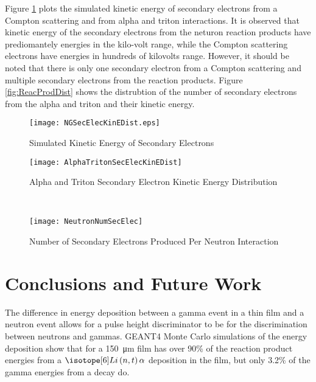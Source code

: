\documentclass[draftcls,onecolumn]{IEEEtran}
\begin{document}
Figure \ref{fig:simKinE} plots the simulated kinetic energy of secondary electrons from a Compton scattering and from alpha and triton interactions.
It is observed that kinetic energy of the secondary electrons from the neturon reaction products have prediomantely energies in the kilo-volt range, while the Compton scattering electrons have energies in hundreds of kilovolts range. 
However, it should be noted that there is only one secondary electron from a Compton scattering and multiple secondary electrons from the reaction products.
Figure \ref{fig:ReacProdDist} shows the distrubtion of the number of secondary electrons from the alpha and triton and their kinetic energy.
\begin{figure}[ht]
    \centering
    \texttt{[image: NGSecElecKinEDist.eps]}
    \caption{Simulated Kinetic Energy of Secondary Electrons }
    \label{fig:simKinE}
\end{figure}
\begin{figure*}[ht]
	\centering
	\begin{subfigure}[b]{0.45\textwidth}
    		\texttt{[image: AlphaTritonSecElecKinEDist]}
		\caption{Alpha and Triton Secondary Electron Kinetic Energy Distribution}
	\end{subfigure}%
	~
	\begin{subfigure}[b]{0.45\textwidth}
    		\texttt{[image: NeutronNumSecElec]}
		\caption{Number of Secondary Electrons Produced Per Neutron Interaction}
	\end{subfigure}%
	\caption{Neutron Reaction Products Secondary Electrons Energies}
	\label{fig:ReacProdDist}
\end{figure*}
\section{Conclusions and Future Work}
\label{sec:Conclusions}

The difference in energy deposition between a gamma event in a thin film and a neutron event allows for a pulse height discriminator to be for the discrimination between neutrons and gammas.
GEANT4 Monte Carlo simulations of the energy deposition show that for a \SI{150}{\um} film has over 90\% of the reaction product energies from a $\iso[6]{Li}\left(n,t\right)\alpha$ deposition in the film, but only 3.2\% of the gamma energies from a  decay do.
\end{document}
